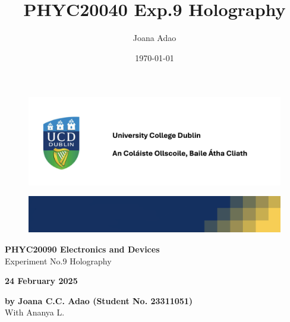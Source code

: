 \documentclass[12pt]{article}
\title{PHYC20040 Exp.9 Holography}
\author{Joana Adao}
\date{\today}
\begin{document}
\begin{titlepage}
    \begin{center}

        \begin{figure}[ht]
            \includegraphics[width=\textwidth]{UCDLogo.png}
        \end{figure}
        
        \begin{figure}
            \centerline{\includegraphics[width=\paperwidth]{UCDBanner.png}}
        \end{figure}

        \vspace{4cm}

        {\LARGE \bfseries PHYC20090 Electronics and Devices}\\
        \vspace{0.75cm}
        {\Large Experiment No.9 Holography}
        
        \vspace{1cm}
    
    {\Large \textbf{24 February 2025}}

    \vspace{2cm}
    
    {\large \textbf{by Joana C.C. Adao (Student No. 23311051)}}\\
    \medskip
    {\large With Ananya L.}

    \end{center}
    
   \clearpage

\end{titlepage}

\setcounter{page}{1}
\tableofcontents
{}

\newpage
\end{document}
